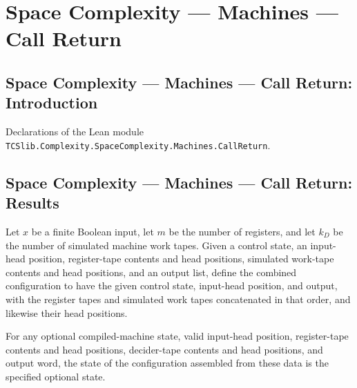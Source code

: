 \section{Space Complexity --- Machines --- Call Return}
\subsection*{Space Complexity --- Machines --- Call Return: Introduction}

Declarations of the Lean module \texttt{TCSlib.Complexity.SpaceComplexity.Machines.CallReturn}.

\subsection*{Space Complexity --- Machines --- Call Return: Results}

\begin{definition}
\label{Complexity.LogProg.mkCfg}
\leanok
{}
Let $x$ be a finite Boolean input, let $m$ be the number of registers, and let $k_D$ be
the number of simulated machine work tapes. Given a control state, an input-head
position, register-tape contents and head positions, simulated work-tape contents and
head positions, and an output list, define the combined configuration to have the given
control state, input-head position, and output, with the register tapes and simulated
work tapes concatenated in that order, and likewise their head positions.
\end{definition}

\begin{lemma}
\label{Complexity.LogProg.mkCfg_state}
\leanok
{}
For any optional compiled-machine state, valid input-head position, register-tape
contents and head positions, decider-tape contents and head positions, and output word,
the state of the configuration assembled from these data is the specified optional
state.
\end{lemma}

